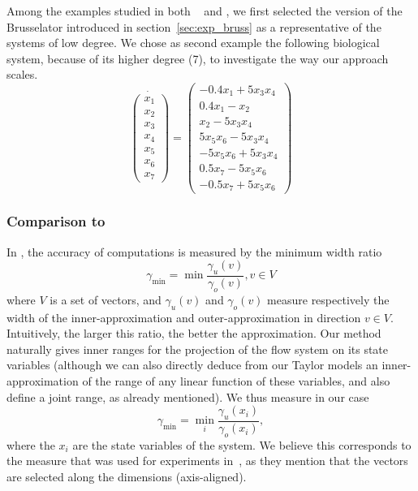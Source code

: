 
Among the examples studied in both ~\cite{Underapproxflowpipes} and \cite{underapprox16}, we first selected
the version of the Brusselator introduced in section~\ref{sec:exp_bruss} as a representative of the systems of low degree. 
We chose as second example the following biological system, because of its higher degree (7), to investigate the way our approach scales. 
\begin{equation}
\dot{\left(\begin{array}{c}
x_1 \\
x_2 \\
x_3 \\
x_4 \\
x_5 \\
x_6 \\
x_7
\end{array}\right)} = \left(\begin{array}{c}
-0.4x_1+5x_3x_4 \\
0.4x_1-x_2 \\
x_2-5x_3x_4 \\
5x_5x_6-5x_3x_4 \\
-5x_5x_6+5x_3x_4 \\
0.5x_7-5x_5x_6 \\
-0.5x_7+5x_5x_6
\end{array}\right)
\end{equation}


\subsubsection{Comparison to \cite{Underapproxflowpipes}}
In  \cite{Underapproxflowpipes}, the  accuracy of computations is measured by the minimum width ratio 
\[ \gamma_{\min}=\min{\frac{\gamma_u(v)}{\gamma_o(v)}}, v \in V \]
where $V$ is a set of vectors, and $\gamma_u(v)$ and $\gamma_o(v)$ measure respectively the width of the inner-approximation and outer-approximation
in direction $v \in V$. 
Intuitively, the larger this ratio, the better the approximation. 
Our method naturally gives inner ranges for the projection of the flow system on its state variables (although we can also directly deduce from our Taylor models 
an inner-approximation of the range of any linear function of these variables, and also define a joint range, as 
already mentioned).
We thus measure in our case \[ \gamma_{\min}=\min_{i}{\frac{\gamma_u(x_i)}{\gamma_o(x_i)}}, \]
where the $x_i$ are the state variables of the system. We believe this corresponds to the measure that was used for experiments 
in~\cite{Underapproxflowpipes}, as they mention that the vectors are selected along the dimensions (axis-aligned).


